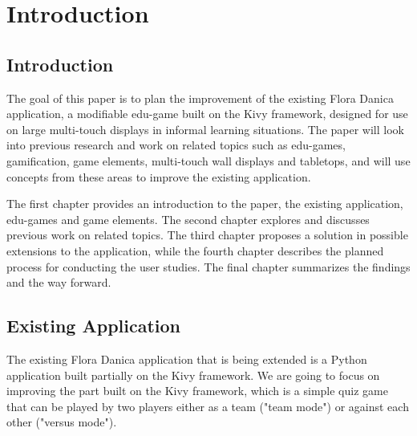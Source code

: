 
\chapter{Introduction}

\label{Chapter1}



\section{Introduction}

The goal of this paper is to plan the improvement of the existing Flora Danica application, a modifiable edu-game built on the Kivy framework\citep{Kivy}, designed for use on large multi-touch displays in informal learning situations. The paper will look into previous research and work on related topics such as edu-games, gamification, game elements, multi-touch wall displays and tabletops, and will use concepts from these areas to improve the existing application.

The first chapter provides an introduction to the paper, the existing application, edu-games and game elements. The second chapter explores and discusses previous work on related topics. The third chapter proposes a solution in possible extensions to the application, while the fourth chapter describes the planned process for conducting the user studies. The final chapter summarizes the findings and the way forward.


\section{Existing Application}

The existing Flora Danica application that is being extended is a Python application built partially on the Kivy framework\citep{Kivy}. We are going to focus on improving the part built on the Kivy framework, which is a simple quiz game that can be played by two players either as a team ("team mode") or against each other ("versus mode").

